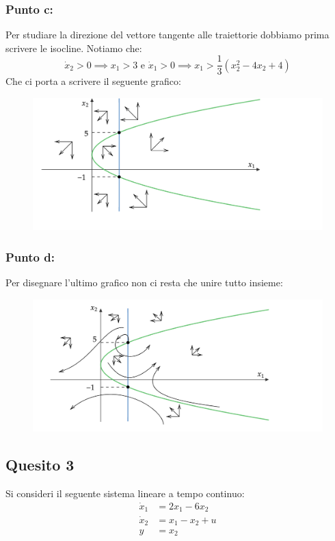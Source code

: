 \documentclass[a4paper]{report}
\begin{document}
\subsubsection*{Punto c:}
Per studiare la direzione del vettore tangente alle traiettorie dobbiamo prima scrivere le isocline. Notiamo che:
\[
\dot{x}_2>0\implies x_1>3 \text{ e } \dot{x}_1>0\implies x_1>\frac{1}{3}(x_2^2-4x_2+4)
\]\newpage
Che ci porta a scrivere il seguente grafico:
\begin{figure}[h]
\includegraphics[width=\textwidth]{isocline}
\end{figure}
\subsubsection*{Punto d:}
Per disegnare l'ultimo grafico non ci resta che unire tutto insieme:
\begin{figure}[h]
\includegraphics[width=\textwidth]{trajectories}
\end{figure}
\subsection*{Quesito 3}
Si consideri il seguente sistema lineare a tempo continuo:
\begin{align*}
\dot{x}_1&=2x_1-6x_2\\
\dot{x}_2&=x_1-x_2+u\\
y&=x_2
\end{align*}
\end{document}
